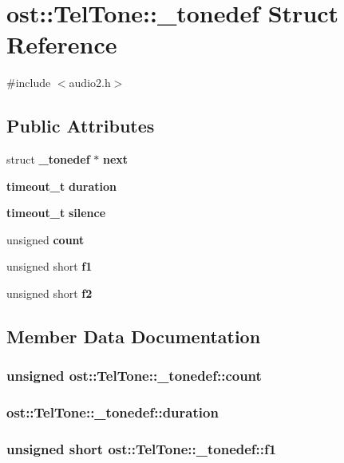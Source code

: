 \section{ost::TelTone::\_\-tonedef Struct Reference}
\label{structost_1_1_tel_tone_1_1__tonedef}


{\ttfamily \#include $<$audio2.h$>$}\subsection*{Public Attributes}
\begin{DoxyCompactItemize}
\item 
struct {\bf \_\-tonedef} $\ast$ {\bf next}
\item 
{\bf timeout\_\-t} {\bf duration}
\item 
{\bf timeout\_\-t} {\bf silence}
\item 
unsigned {\bf count}
\item 
unsigned short {\bf f1}
\item 
unsigned short {\bf f2}
\end{DoxyCompactItemize}


\subsection{Member Data Documentation}
\subsubsection[{count}]{\setlength{\rightskip}{0pt plus 5cm}unsigned {\bf ost::TelTone::\_\-tonedef::count}}\label{structost_1_1_tel_tone_1_1__tonedef_a9c5e73aacc5fc6bbebde09946c8b57e8}
\subsubsection[{duration}]{ {\bf ost::TelTone::\_\-tonedef::duration}}\label{structost_1_1_tel_tone_1_1__tonedef_a3056f75cb554954ec745e5b10caff6ec}
\subsubsection[{f1}]{\setlength{\rightskip}{0pt plus 5cm}unsigned short {\bf ost::TelTone::\_\-tonedef::f1}}\label{structost_1_1_tel_tone_1_1__tonedef_aa8947bc6f45bfcf74e804cfca5a80293}
